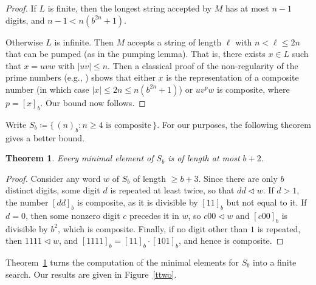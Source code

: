 \documentclass[12pt]{article}
\def\subw{\mathrel{\triangleleft}}
\theoremstyle{plain}
\newtheorem{theorem}{Theorem}
\theoremstyle{definition}
\theoremstyle{remark}
\newcommand{\0}{\mathtt{0}}
\newcommand{\1}{\mathtt{1}}
\newcommand{\2}{\mathtt{2}}
\newcommand{\3}{\mathtt{3}}
\newcommand{\4}{\mathtt{4}}
\newcommand{\5}{\mathtt{5}}
\newcommand{\6}{\mathtt{6}}
\newcommand{\7}{\mathtt{7}}
\newcommand{\8}{\mathtt{8}}
\newcommand{\9}{\mathtt{9}}
\newcommand{\set}[2]{\{\,#1{}:{}#2\,\}}
\begin{document}
\begin{proof}
If $L$ is finite, then the longest string accepted by $M$ has
at most $n-1$ digits, and $n-1 < n(b^{2n} + 1)$.

Otherwise $L$ is infinite.  Then $M$ accepts a string of length
$\ell$ with $n < \ell \leq 2n$ that can be pumped (as in the
pumping lemma).  That is, there exists $x \in L$ such that
$x = uvw$ with $|uv| \leq n$.  Then a classical proof of the
non-regularity of the prime numbers 
(e.g., \cite[Example 3.2, p.\ 57]{HU79})
shows that either $x$ is the representation of a composite 
number (in which case $|x| \leq 2n \leq n(b^{2n} + 1)$)
or $u v^p w$ is composite, where $p = [x]_b$.  
Our bound now follows.
\end{proof}

Write $S_b \coloneqq \set{(n)_b}{\text{$n \geq 4$ is composite}}$.
For our purposes, the following theorem gives a better bound.

\begin{theorem}
Every minimal element of $S_b$ is of length at most $b+2$.
\label{devi}
\end{theorem}

\begin{proof}
Consider any word $w$ of $S_b$ of length $\geq b+3$.   Since there are only
$b$ distinct digits, some digit $d$ is repeated at least twice,
so that $dd \subw w$.  If $d > 1$, the number $[dd]_b$ is composite,
as it is divisible by $[11]_b$ but not equal to it.  If $d = 0$,
then some nonzero digit $c$ precedes it in $w$, so $c00 \subw w$
and $[c00]_b$ is divisible by $b^2$, which is composite.
Finally, if no digit other than $1$ is repeated, then 
$1111 \subw w$, and $[1111]_b = [11]_b \cdot [101]_b$, and hence
is composite.
\end{proof}

Theorem~\ref{devi} turns the computation of the minimal elements for
$S_b$ into a finite search.  Our results are given in Figure~\ref{ttwo}.
\end{document}
